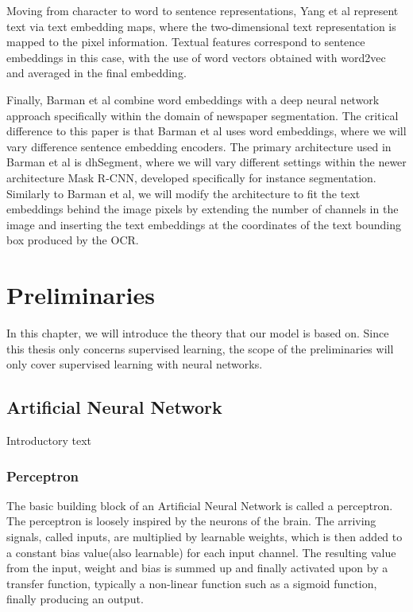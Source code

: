 \documentclass[english, bibtex]{kththesis}
\begin{document}
Moving from character to word to sentence representations, Yang et al\cite{DBLP:journals/corr/YangYAKKG17} represent text via text embedding maps, where the two-dimensional text representation is mapped to the pixel information. Textual features correspond to sentence embeddings in this case, with the use of word vectors obtained with word2vec\cite{mikolov2013} and averaged in the final embedding. 

Finally, Barman et al\cite{jdmdh:7097} combine word embeddings with a deep neural network approach specifically within the domain of newspaper segmentation. The critical difference to this paper is that Barman et al\cite{jdmdh:7097} uses word embeddings, where we will vary difference sentence embedding encoders. The primary architecture used in Barman et al\cite{jdmdh:7097} is dhSegment, where we will vary different settings within the newer architecture Mask R-CNN, developed specifically for instance segmentation. Similarly to Barman et al\cite{jdmdh:7097}, we will modify the architecture to fit the text embeddings behind the image pixels by extending the number of channels in the image and inserting the text embeddings at the coordinates of the text bounding box produced by the OCR. 

\cleardoublepage
\chapter{Preliminaries}
\label{ch:preliminaries}

In this chapter, we will introduce the theory that our model is based on. Since this thesis only concerns supervised learning, the scope of the preliminaries will only cover supervised learning with neural networks.

\section{Artificial Neural Network}

Introductory text

\subsection{Perceptron}
The basic building block of an Artificial Neural Network is called a perceptron. The perceptron is loosely inspired by the neurons of the brain.\cite{rosenblatt1958perceptron} The arriving signals, called inputs, are multiplied by learnable weights, which is then added to a constant bias value(also learnable) for each input channel. The resulting value from the input, weight and bias is summed up and finally activated upon by a transfer function, typically a non-linear function such as a sigmoid function, finally producing an output. 
\end{document}
